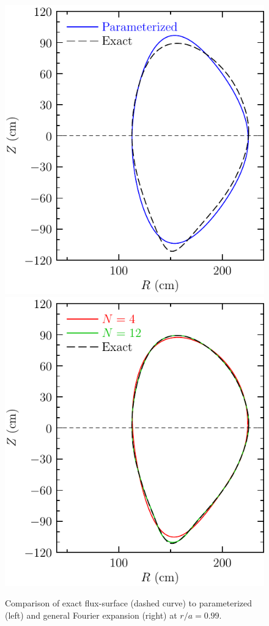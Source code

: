 \begin{figure}
\begin{center}
\includegraphics[scale=0.8]{figures/surf2.pdf}
\hskip 0.1in
\includegraphics[scale=0.8]{figures/surf3.pdf}
\caption{Comparison of exact flux-surface (dashed curve) to 
parameterized (left) and general Fourier expansion (right)
at $r/a=0.99$.}
\label{fig.surf23}
\end{center}
\end{figure}

